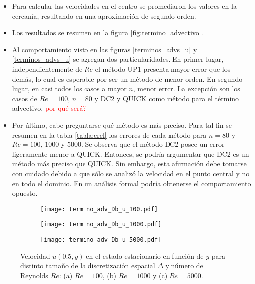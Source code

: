 \documentclass[aps,prb,twocolumn,superscriptaddress,floatfix,longbibliography,10pt]{revtex4-2}
\newcounter{para}
\begin{document}
\begin{itemize}
  \item Para calcular las velocidades en el centro se promediaron los valores en la cercanía, resultando en una aproximación de segundo orden.
  \item Los resultados se resumen en la figura \ref{fig:termino_advectivo}.
  \item Al comportamiento visto en las figuras \ref{terminos_advs_u} y \ref{terminos_advs_u} se agregan dos particularidades. En primer lugar, independientemente de $Re$ el método UP1 presenta mayor error que los demás, lo cual es esperable por ser un método de menor orden. En segundo lugar, en casi todos los casos a mayor $n$, menor error. La excepción son los casos de $Re = 100$, $n = 80$ y DC2 y QUICK como método para el término advectivo. \textcolor{red}{por qué será?}

  \item Por último, cabe preguntarse qué método es más preciso. Para tal fin se resumen en la tabla \ref{tabla:erel} los errores de cada método para $n = 80$ y $Re = 100$, $1000$ y $5000$. Se observa que el método DC2 posee un error ligeramente menor a QUICK. Entonces, se podría argumentar que DC2 es un método más preciso que QUICK. Sin embargo, esta afirmación debe tomarse con cuidado debido a que sólo se analizó la velocidad en el punto central y no en todo el dominio. En un análisis formal podría obtenerse el comportamiento opuesto.
\end{itemize}




\onecolumngrid


\begin{figure}
  \centering
  \begin{subfigure}[b]{0.32\textwidth}
      \centering
      \texttt{[image: termino\_adv\_Db\_u\_100.pdf]}
      \caption{}
      \label{fig:termino_adv_Db_u_100}
  \end{subfigure}
  \hfill
  \begin{subfigure}[b]{0.32\textwidth}
      \centering
      \texttt{[image: termino\_adv\_Db\_u\_1000.pdf]}
      \caption{}
      \label{fig:termino_adv_Db_u_1000}
  \end{subfigure}
  \hfill
  \begin{subfigure}[b]{0.32\textwidth}
      \centering
      \texttt{[image: termino\_adv\_Db\_u\_5000.pdf]}
      \caption{}
      \label{fig:termino_adv_Db_u_5000}
  \end{subfigure}
     \caption{Velocidad $u(0.5,y)$ en el estado estacionario en función de $y$ para distinto tamaño de la discretización espacial $\Delta$ y número de Reynolds $Re$: (a) $Re = 100$, (b) $Re = 1000$ y (c) $Re = 5000$.}
     \label{fig:velocidades_u_DC2_vs_Re}
\end{figure}
\end{document}
